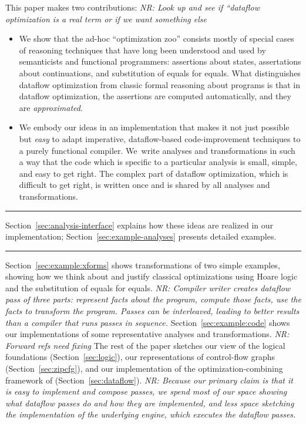 \documentclass[blockstyle,preprint,nocopyrightspace]{sigplanconf}
\newcommand{\authornote}[1]{{\em #1}}
\newcommand{\norman}[1]{\authornote{NR: #1}}
\let\remark\norman
\newcommand\secref[1]{Section~\ref{sec:#1}}
\begin{document}
This paper makes two contributions:
\remark{Look up and see if ``dataflow optimization is a real term or
  if we want something else}
\begin{itemize}
\item
We show that the ad-hoc ``optimization zoo'' consists mostly of special
cases of reasoning techniques that have long been understood and used
by semanticists and functional programmers:
assertions about states, assertations about continuations, and
substitution of equals for equals.
What distinguishes dataflow optimization from classic formal reasoning
about programs is that in dataflow optimization, the assertions are
computed automatically, and they are
\emph{approximated}. 
\item
We embody our ideas in an implementation that makes it not just
possible but \emph{easy} to adapt imperative, dataflow-based
code-improvement techniques to a purely functional compiler.
We~write analyses and transformations in such a way that
the code which is specific to a particular analysis is small, simple,
and easy to get right.
The complex part of dataflow optimization, which is difficult to get right, is
written once and is shared by all analyses and transformations.
\end{itemize}

\hrule

\secref{analysis-interface} explains how these ideas are realized in
our implementation; \secref{example-analyses} presents detailed examples.

\hrule



\secref{example:xforms} shows transformations of two simple examples,
showing how we think about and justify classical optimizations using
Hoare logic and the substitution of equals for equals.
\remark{Compiler writer creates dataflow pass of three parts:
represent facts about the program, compute those facts, use the facts
to transform the program.   Passes can be interleaved,
leading to better results than a compiler that runs passes in sequence.}
\secref{example:code} shows our implementations of some representative analyses
and transformations.
\remark{Forward refs need fixing}
The rest of the paper sketches 
our view of the logical foundations (\secref{logic}), 
our representations of control-flow graphs (\secref{zipcfg}),
and our implementation of the optimization-combining framework of
\citet{lerner-grove-chambers:2002} (\secref{dataflow}).
\remark{Because our primary claim is that it is easy to implement and
compose passes, we spend most of our space showing what dataflow
passes do and how they are implemented, and less space sketching the
implementation of the underlying engine, which executes the dataflow
passes.} 
%
\end{document}
